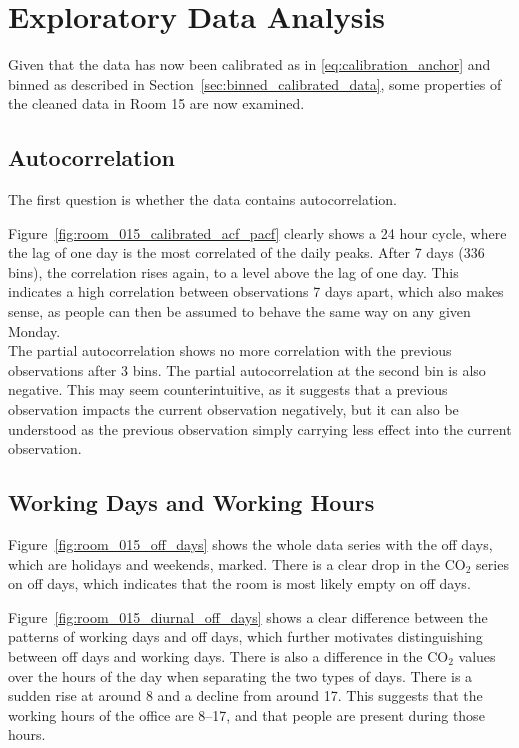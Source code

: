 \section{Exploratory Data Analysis}
Given that the data has now been calibrated as in \cref{eq:calibration_anchor} and
binned as described in Section~\ref{sec:binned_calibrated_data}, some properties of the cleaned data in Room 15
are now examined.

\subsection{Autocorrelation}
The first question is whether the data contains autocorrelation.


Figure~\ref{fig:room_015_calibrated_acf_pacf} clearly shows a 24 hour cycle, where the lag of one day is the most
correlated of the daily peaks. After 7 days (336 bins), the correlation rises again, to a level above the lag of one day.
This indicates a high correlation between observations 7 days apart, which also makes sense,
as people can then be assumed to behave the same way on any given Monday.\\
The partial autocorrelation shows no more correlation with the previous observations after 3 bins.
The partial autocorrelation at the second bin is also negative. This may seem
counterintuitive, as it suggests that a previous observation impacts the current observation negatively, but it can also be
understood as the previous observation simply carrying less effect into the current observation.

\subsection{Working Days and Working Hours}
Figure~\ref{fig:room_015_off_days} shows the whole data series with the off days, which are holidays and weekends, marked.
There is a clear drop in the $\text{CO}_2$ series on off days, which indicates that
the room is most likely empty on off days.

Figure~\ref{fig:room_015_diurnal_off_days} shows a clear difference between the patterns of working days and off days, which further
motivates distinguishing between off days and working days. There is also a difference in the $\text{CO}_2$ values over the hours of the day
when separating the two types of days. There is a sudden rise at around 8 and a decline from around 17. This suggests that the working hours
of the office are 8--17, and that people are present during those hours.


